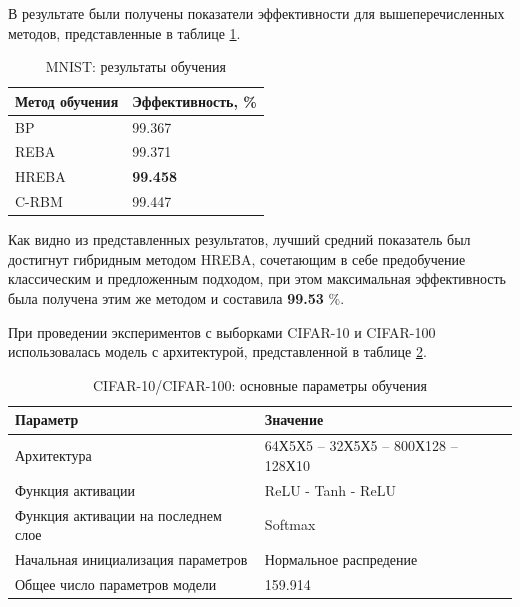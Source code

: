 В результате были получены показатели эффективности для вышеперечисленных методов, представленные в таблице \ref{table:mnist_results}.

\begin{table} [!h]
  \caption{MNIST: результаты обучения}\label{table:mnist_results}
\centering
\begin{tabular}{| p{6cm} | p{6cm} |}
  \hline
    \textbf{Метод обучения} & \textbf{Эффективность, \%}\\
    \hline
    BP & 99.367\\
    \hline
    REBA & 99.371\\
    \hline
    HREBA & \textbf{99.458}\\
    \hline
    C-RBM & 99.447\\
    \hline
\end{tabular}
\end{table}

Как видно из представленных результатов, лучший средний показатель был достигнут гибридным методом HREBA, сочетающим в себе предобучение классическим и предложенным подходом, при этом максимальная эффективность была получена этим же методом и составила \textbf{99.53} \%.

При проведении экспериментов с выборками CIFAR-10 и CIFAR-100 использовалась модель с архитектурой, представленной в таблице \ref{table:cifar_comparison_params}.

\begin{table}[!h]
    \caption{CIFAR-10/CIFAR-100: основные параметры обучения}\label{table:cifar_comparison_params}
    \begin{tabular}{|p{7cm}|p{8cm}|}
        \hline
        \textbf{Параметр} & \textbf{Значение}\\
        \hline
        Архитектура & 64Х5Х5 -- 32Х5Х5 -- 800Х128 -- 128Х10\\
        \hline
        Функция активации & ReLU - Tanh - ReLU \\
        \hline
        Функция активации на последнем слое & Softmax \\
        \hline
        Начальная инициализация параметров & Нормальное распредение \\
        \hline
        Общее число параметров модели & 159.914
        \\
        \hline
    \end{tabular}
\end{table}




